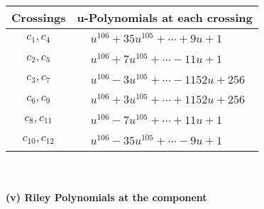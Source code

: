 \documentclass[1p]{elsarticle_modified}
\theoremstyle{definition}
\begin{document}
\begin{tabular}{m{50pt}|m{274pt}}
Crossings & \hspace{64pt}u-Polynomials at each crossing \\
\hline $$\begin{aligned}c_{1},c_{4}\end{aligned}$$&$\begin{aligned}
&u^{106}+35 u^{105}+\cdots+9 u+1
\end{aligned}$\\
\hline $$\begin{aligned}c_{2},c_{5}\end{aligned}$$&$\begin{aligned}
&u^{106}+7 u^{105}+\cdots-11 u+1
\end{aligned}$\\
\hline $$\begin{aligned}c_{3},c_{7}\end{aligned}$$&$\begin{aligned}
&u^{106}-3 u^{105}+\cdots-1152 u+256
\end{aligned}$\\
\hline $$\begin{aligned}c_{6},c_{9}\end{aligned}$$&$\begin{aligned}
&u^{106}+3 u^{105}+\cdots+1152 u+256
\end{aligned}$\\
\hline $$\begin{aligned}c_{8},c_{11}\end{aligned}$$&$\begin{aligned}
&u^{106}-7 u^{105}+\cdots+11 u+1
\end{aligned}$\\
\hline $$\begin{aligned}c_{10},c_{12}\end{aligned}$$&$\begin{aligned}
&u^{106}-35 u^{105}+\cdots-9 u+1
\end{aligned}$\\
\hline
\end{tabular}\\~\\
\newpage\renewcommand{\arraystretch}{1}
\flushleft \textbf{(v) Riley Polynomials at the component}\newline \\
\end{document}
